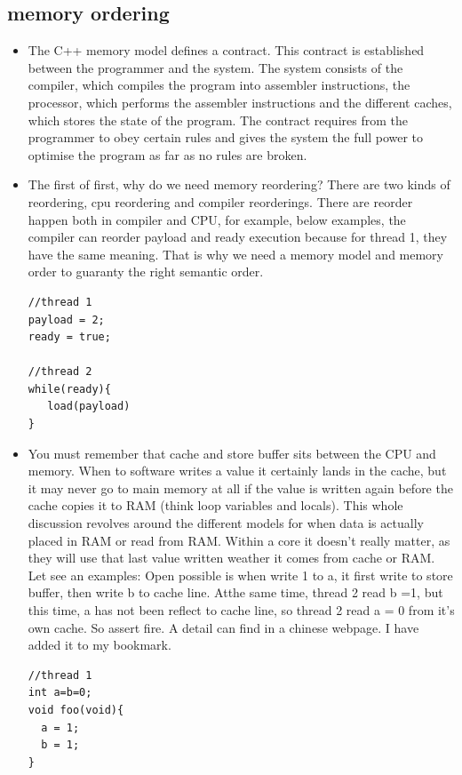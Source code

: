\documentclass[a4paper,11pt,twoside]{book}
\begin{document}
\subsection{memory ordering}
\begin{itemize}
    \item The C++ memory model defines a contract. This contract is established between the programmer and the system. The system consists of the compiler, which compiles the program into assembler instructions, the processor, which performs the assembler instructions and the different caches, which stores the state of the program. The contract requires from the programmer to obey certain rules and gives the system the full power to optimise the program as far as no rules are broken. 

    \item The first of first, why do we need memory reordering? There are two kinds of reordering, cpu reordering and compiler reorderings. There are reorder happen both in compiler and CPU, for example, below examples, the compiler can reorder payload and ready execution because for thread 1, they have the same meaning. That is why we need a memory model and memory order to guaranty the right semantic order. 

\begin{lstlisting}
//thread 1
payload = 2;
ready = true;

//thread 2
while(ready){
   load(payload)
}
\end{lstlisting}

	\item You must remember that cache and store buffer sits between the CPU and memory. When to software writes a value it certainly lands in the cache, but it may never go to main memory at all if the value is written again before the cache copies it to RAM (think loop variables and locals). This whole discussion revolves around the different models for when data is actually placed in RAM or read from RAM. Within a core it doesn't really matter, as they will use that last value written weather it comes from cache or RAM. Let see an examples: Open possible is when write 1 to a, it first write to store buffer, then write b to cache line. Atthe same time, thread 2 read b =1, but this time, a has not been reflect to cache line, so thread 2 read a = 0 from it's own cache. So assert fire. A detail can find in a chinese webpage. I have added it to my bookmark. 

\begin{lstlisting}
//thread 1
int a=b=0;
void foo(void){
  a = 1;
  b = 1;
}


\end{lstlisting}
\end{itemize}
\end{document}
